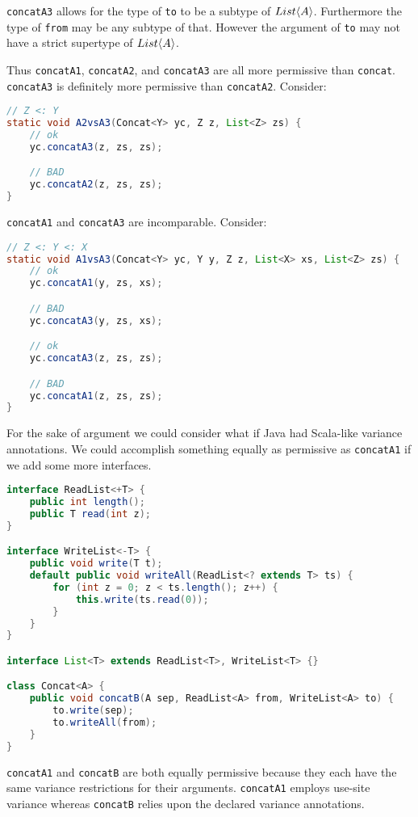 \documentclass{article}
\begin{document}
\begin{example}
  \texttt{concatA3} allows for the type of \texttt{to} to be a subtype of $List \langle A \rangle$.
  Furthermore the type of \texttt{from} may be any subtype of that.
  However the argument of \texttt{to} may not have a strict supertype of $List \langle A \rangle$.

  Thus \texttt{concatA1}, \texttt{concatA2}, and \texttt{concatA3} are all more permissive than \texttt{concat}.
  \texttt{concatA3} is definitely more permissive than \texttt{concatA2}.
  Consider:
\begin{lstlisting}[escapechar=|, language=Java]
// Z <: Y
static void A2vsA3(Concat<Y> yc, Z z, List<Z> zs) {
    // ok
    yc.concatA3(z, zs, zs);

    // BAD
    yc.concatA2(z, zs, zs);
}
\end{lstlisting}
  \texttt{concatA1} and \texttt{concatA3} are incomparable.
  Consider:
\begin{lstlisting}[escapechar=|, language=Java]
// Z <: Y <: X
static void A1vsA3(Concat<Y> yc, Y y, Z z, List<X> xs, List<Z> zs) {
    // ok
    yc.concatA1(y, zs, xs);

    // BAD
    yc.concatA3(y, zs, xs);

    // ok    
    yc.concatA3(z, zs, zs);

    // BAD
    yc.concatA1(z, zs, zs);
}
\end{lstlisting}

  For the sake of argument we could consider what if Java had Scala-like variance annotations.
  We could accomplish something equally as permissive as \texttt{concatA1} if we add some more interfaces.
\begin{lstlisting}[escapechar=|, language=Java]
interface ReadList<+T> {
    public int length();
    public T read(int z);
}

interface WriteList<-T> {
    public void write(T t);
    default public void writeAll(ReadList<? extends T> ts) {
        for (int z = 0; z < ts.length(); z++) {
            this.write(ts.read(0));
        }
    }
}

interface List<T> extends ReadList<T>, WriteList<T> {}

class Concat<A> {
    public void concatB(A sep, ReadList<A> from, WriteList<A> to) {
        to.write(sep);
        to.writeAll(from);
    }
}
\end{lstlisting}
  \texttt{concatA1} and \texttt{concatB} are both equally permissive because they each have the same variance restrictions for their arguments.
  \texttt{concatA1} employs use-site variance whereas \texttt{concatB} relies upon the declared variance annotations.
\end{example}
\end{document}
